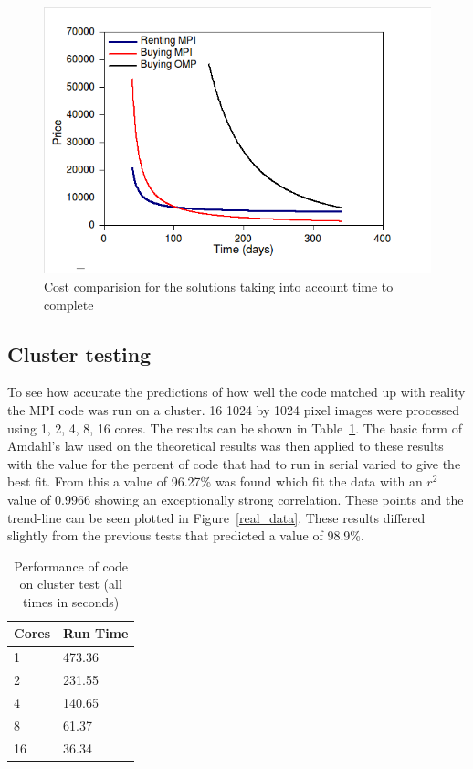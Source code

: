 \begin{figure}[ht]
	\begin{center}
		\includegraphics[width=1.0\textwidth]{mpi-time-money}
	\end{center}
	\caption{Cost comparision for the solutions taking into account time to complete}
	\label{mpi-time-money}
\end{figure}


\subsection*{Cluster testing}
To see how accurate the predictions of how well the code matched up with reality the MPI code was run on a cluster. 16 1024 by 1024 pixel images were processed using 1, 2, 4, 8, 16 cores. The results can be shown in Table~\ref{shit}. The basic form of Amdahl's law used on the theoretical results was then applied to these results with the value for the percent of code that had to run in serial varied to give the best fit. From this a value of 96.27\% was found which fit the data with an \(r^2\) value of 0.9966 showing an exceptionally strong correlation. These points and the trend-line can be seen plotted in Figure~\ref{real_data}. These results differed slightly from the previous tests that predicted a value of 98.9\%. 

\begin{table}[h]
	\caption{Performance of code on cluster test (all times in seconds)}
	\begin{center}
    	\begin{tabular}{ | l | l |}
    	\hline
    	Cores & Run Time  \\ \hline
		1 & 473.36 \\ \hline
		2 & 231.55 \\ \hline
		4 & 140.65 \\ \hline
		8 & 61.37 \\ \hline
		16 & 36.34 \\ \hline
    	\end{tabular}
	\end{center}
	\label{shit}
\end{table}

